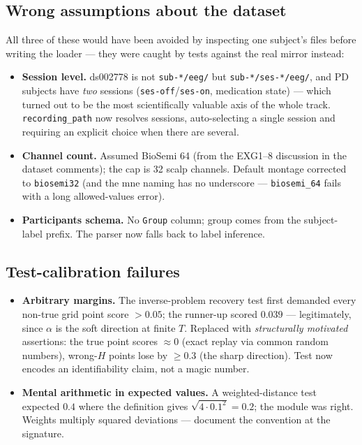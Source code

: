 \documentclass[11pt]{article}
\begin{document}
\subsection{Wrong assumptions about the dataset}

All three of these would have been avoided by inspecting one subject's files
before writing the loader --- they were caught by tests against the real
mirror instead:

\begin{itemize}[leftmargin=1.6em]
  \item \textbf{Session level.} ds002778 is not
        \texttt{sub-*/eeg/} but \texttt{sub-*/ses-*/eeg/}, and PD subjects
        have \emph{two} sessions (\texttt{ses-off}/\texttt{ses-on},
        medication state) --- which turned out to be the most scientifically
        valuable axis of the whole track. \texttt{recording\_path} now
        resolves sessions, auto-selecting a single session and requiring an
        explicit choice when there are several.
  \item \textbf{Channel count.} Assumed BioSemi 64 (from the EXG1--8
        discussion in the dataset comments); the cap is 32 scalp channels.
        Default montage corrected to \texttt{biosemi32} (and the mne naming
        has no underscore --- \texttt{biosemi\_64} fails with a long
        allowed-values error).
  \item \textbf{Participants schema.} No \texttt{Group} column; group comes
        from the subject-label prefix. The parser now falls back to label
        inference.
\end{itemize}

\subsection{Test-calibration failures}

\begin{itemize}[leftmargin=1.6em]
  \item \textbf{Arbitrary margins.} The inverse-problem recovery test first
        demanded every non-true grid point score $> 0.05$; the runner-up
        scored $0.039$ --- legitimately, since $\alpha$ is the soft direction
        at finite $T$. Replaced with \emph{structurally motivated}
        assertions: the true point scores $\approx 0$ (exact replay via
        common random numbers), wrong-$H$ points lose by $\geq 0.3$
        (the sharp direction). Test now encodes an identifiability claim, not
        a magic number.
  \item \textbf{Mental arithmetic in expected values.} A weighted-distance
        test expected $0.4$ where the definition gives $\sqrt{4 \cdot 0.1^2}
        = 0.2$; the module was right. Weights multiply squared deviations ---
        document the convention at the signature.
\end{itemize}
\end{document}
